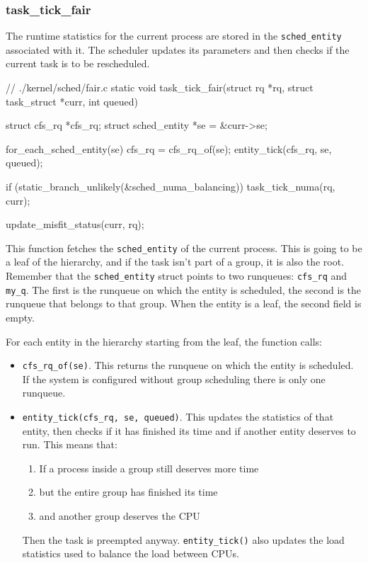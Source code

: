 \subsubsection{task\_tick\_fair}

The runtime statistics for the current process are stored in the \verb|sched_entity| associated with it. The scheduler updates its parameters and then checks if the current task is to be rescheduled. 

\begin{code}
// ./kernel/sched/fair.c
static void task_tick_fair(struct rq *rq, struct task_struct *curr, int queued)
{
	struct cfs_rq *cfs_rq;
	struct sched_entity *se = &curr->se;

	for_each_sched_entity(se) {
		cfs_rq = cfs_rq_of(se);
		entity_tick(cfs_rq, se, queued);
	}

	if (static_branch_unlikely(&sched_numa_balancing))
		task_tick_numa(rq, curr);

	update_misfit_status(curr, rq);
}
\end{code}
This function fetches the \verb|sched_entity| of the current process. This is going to be a leaf of the hierarchy, and if the task isn't part of a group, it is also the root. Remember that the \verb|sched_entity| struct points to two runqueues: \verb|cfs_rq| and \verb|my_q|. The first is the runqueue on which the entity is scheduled, the second is the runqueue that belongs to that group. When the entity is a leaf, the second field is empty. 

For each entity in the hierarchy starting from the leaf, the function calls:
\begin{itemize}
    \item \verb|cfs_rq_of(se)|. This returns the runqueue on which the entity is scheduled. If the system is configured without group scheduling there is only one runqueue.
    
    \item \verb|entity_tick(cfs_rq, se, queued)|. This updates the statistics of that entity, then checks if it has finished its time and if another entity deserves to run. This means that:
    \begin{enumerate}
        \item If a process inside a group still deserves more time
        \item but the entire group has finished its time
        \item and another group deserves the CPU
    \end{enumerate}
    Then the task is preempted anyway. \verb|entity_tick()| also updates the load statistics used to balance the load between CPUs.
\end{itemize}

